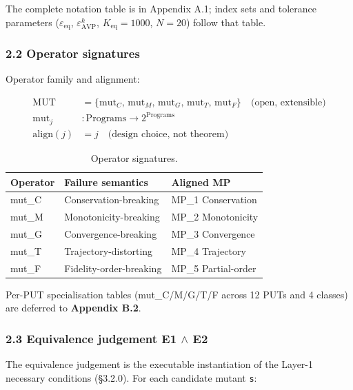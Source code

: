 \documentclass[review,12pt,authoryear]{elsarticle}
\begin{document}
The complete notation table is in Appendix A.1; index sets and tolerance
parameters ($\varepsilon_{\mathrm{eq}}$, $\varepsilon_{\mathrm{AVP}}^k$,
$K_{\mathrm{eq}} = 1000$, $N = 20$) follow that table.

\subsubsection{2.2 Operator signatures}\label{operator-signatures}

Operator family and alignment:

\begin{align*}
\mathrm{MUT} &= \{\mathrm{mut}_C,\, \mathrm{mut}_M,\, \mathrm{mut}_G,\, \mathrm{mut}_T,\, \mathrm{mut}_F\} \quad \text{(open, extensible)} \\
\mathrm{mut}_j &: \text{Programs} \to 2^{\text{Programs}} \\
\mathrm{align}(j) &= j \quad \text{(design choice, not theorem)}
\end{align*}

{\def\LTcaptype{table} %
\begin{longtable}[]{@{}lll@{}}
\caption{Operator signatures.}\label{tab:p2-01}\\
\toprule\noalign{}
Operator & Failure semantics & Aligned MP \\
\midrule\noalign{}
\endhead
\bottomrule\noalign{}
\endlastfoot
mut\_C & Conservation-breaking & MP\_1 Conservation \\
mut\_M & Monotonicity-breaking & MP\_2 Monotonicity \\
mut\_G & Convergence-breaking & MP\_3 Convergence \\
mut\_T & Trajectory-distorting & MP\_4 Trajectory \\
mut\_F & Fidelity-order-breaking & MP\_5 Partial-order \\
\end{longtable}
}

Per-PUT specialisation tables (mut\_C/M/G/T/F across 12 PUTs and 4
classes) are deferred to \textbf{Appendix B.2}.

\subsubsection{2.3 Equivalence judgement E1 $\wedge$ E2}\label{equivalence-judgement-e1-e2-layer-2}

The equivalence judgement is the executable instantiation of the Layer-1
necessary conditions (§3.2.0). For each candidate mutant
\texttt{s\textquotesingle{}}:
\end{document}
